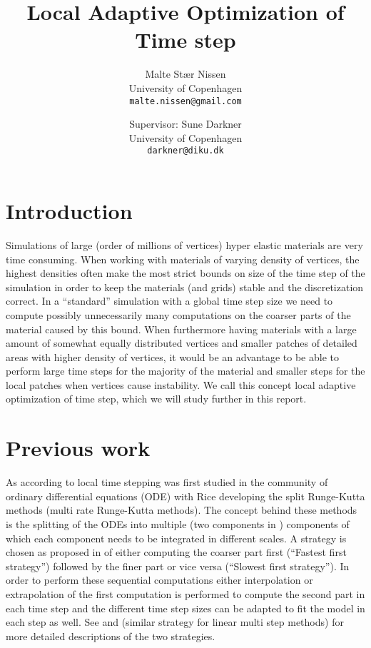 \documentclass[11pt,a4paper]{article}
\title{Local Adaptive Optimization of Time step}
\author{Malte Stær Nissen\\
        University of Copenhagen\\
        \texttt{malte.nissen@gmail.com} \and
        Supervisor: Sune Darkner\\University of Copenhagen\\\texttt{darkner@diku.dk}}
\begin{document}
\maketitle

\tableofcontents

\clearpage

\section{Introduction}
Simulations of large (order of millions of vertices) hyper elastic materials
are very time consuming. When working with materials of varying density
of vertices, the highest densities often make the most strict bounds on
size of the time step of the simulation in order to keep the materials (and
grids) stable and the discretization correct. In a ``standard'' simulation
with a global time step size we need to compute possibly unnecessarily many
computations on the coarser parts of the material caused by this bound.
When furthermore having materials with a large amount of somewhat equally
distributed vertices and smaller patches of detailed areas with higher density
of vertices, it would be an advantage to be able to perform large time steps
for the majority of the material and smaller steps for the local patches when
vertices cause instability. We call this concept local adaptive optimization
of time step, which we will study further in this report.

\section{Previous work}
As according to \cite{Gander:2013} local time stepping was first studied
in the community of ordinary differential equations (ODE) with Rice
\cite{rice:1960} developing the split Runge-Kutta methods (multi rate
Runge-Kutta methods). The concept behind these methods is the splitting of
the ODEs into multiple (two components in \cite{rice:1960}) components of
which each component needs to be integrated in different scales. A strategy
is chosen as proposed in \cite{Kvaernoe:1999} of either computing the coarser
part first (``Fastest first strategy'') followed by the finer part or vice
versa (``Slowest first strategy''). In order to perform these sequential
computations either interpolation or extrapolation of the first computation
is performed to compute the second part in each time step and the different
time step sizes can be adapted to fit the model in each step as well. See
\cite{Kvaernoe:1999} and \cite{Gear:1984} (similar strategy for linear multi
step methods) for more detailed descriptions of the two strategies.
\end{document}
